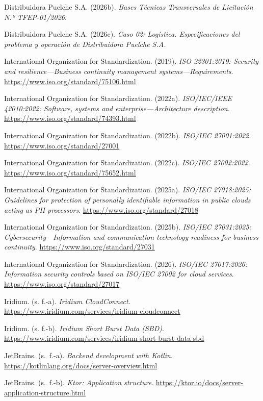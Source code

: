 \begin{list}{}{\setlength{\leftmargin}{1.27cm}\setlength{\itemindent}{-1.27cm}\setlength{\itemsep}{0.5\baselineskip}\raggedright}
\item Distribuidora Puelche S.A. (2026b). \textit{Bases Técnicas Transversales de Licitación N.º TFEP-01/2026}.
\item Distribuidora Puelche S.A. (2026c). \textit{Caso 02: Logística. Especificaciones del problema y operación de Distribuidora Puelche S.A.}
\item International Organization for Standardization. (2019). \textit{ISO 22301:2019: Security and resilience---Business continuity management systems---Requirements}. \url{https://www.iso.org/standard/75106.html}
\item International Organization for Standardization. (2022a). \textit{ISO/IEC/IEEE 42010:2022: Software, systems and enterprise---Architecture description}. \url{https://www.iso.org/standard/74393.html}
\item International Organization for Standardization. (2022b). \textit{ISO/IEC 27001:2022}. \url{https://www.iso.org/standard/27001}
\item International Organization for Standardization. (2022c). \textit{ISO/IEC 27002:2022}. \url{https://www.iso.org/standard/75652.html}
\item International Organization for Standardization. (2025a). \textit{ISO/IEC 27018:2025: Guidelines for protection of personally identifiable information in public clouds acting as PII processors}. \url{https://www.iso.org/standard/27018}
\item International Organization for Standardization. (2025b). \textit{ISO/IEC 27031:2025: Cybersecurity---Information and communication technology readiness for business continuity}. \url{https://www.iso.org/standard/27031}
\item International Organization for Standardization. (2026). \textit{ISO/IEC 27017:2026: Information security controls based on ISO/IEC 27002 for cloud services}. \url{https://www.iso.org/standard/27017}
\item Iridium. (s. f.-a). \textit{Iridium CloudConnect}. \url{https://www.iridium.com/services/iridium-cloudconnect}
\item Iridium. (s. f.-b). \textit{Iridium Short Burst Data (SBD)}. \url{https://www.iridium.com/services/iridium-short-burst-data-sbd}
\item JetBrains. (s.~f.-a). \textit{Backend development with Kotlin}. \url{https://kotlinlang.org/docs/server-overview.html}
\item JetBrains. (s.~f.-b). \textit{Ktor: Application structure}. \url{https://ktor.io/docs/server-application-structure.html}

\end{list}
